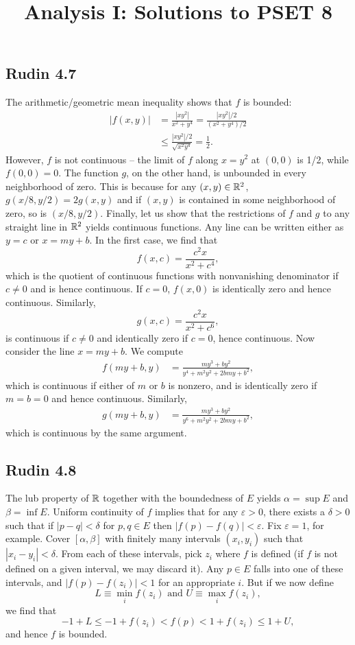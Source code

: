 \documentclass{../mathnotes}
\title{Analysis I: Solutions to PSET 8}
\author{}
\date{}
\begin{document}
\maketitle

\subsection*{Rudin 4.7}

The arithmetic/geometric mean inequality shows that $f$ is bounded:
\begin{align*}
    |f(x,y)| &= \frac{|xy^2|}{x^2+y^4} = \frac{|xy^2|/2}{(x^2+y^4)/2}\\
    &\leq \frac{|xy^2|/2}{\sqrt{x^2y^4}}=\frac{1}{2}.
\end{align*}
However, $f$ is not continuous -- the limit of $f$ along $x=y^2$ at $(0,0)$ is
1/2, while $f(0,0)=0$.
The function $g$, on the other hand, is unbounded in every neighborhood of zero.
This is because for any $(x,y)\in\mathbb{R}^2$, $g\left( x/8,y/2 \right)=2g\left( x,y \right)$
and if $(x,y)$ is contained in some neighborhood of zero, so is $(x/8,y/2)$.
Finally, let us show that the restrictions of $f$ and $g$ to any straight line
in $\mathbb{R}^2$ yields continuous functions. Any line can be written either as $y=c$ or
$x=my+b$. In the first case, we find that
\[f(x,c) = \frac{c^2x}{x^2+c^4},\]
which is the quotient of continuous functions with nonvanishing denominator if $c\neq 0$ and is
hence continuous. If $c=0$, $f(x,0)$ is identically zero and hence continuous.
Similarly,
\[g(x,c) = \frac{c^2x}{x^2+c^6},\]
is continuous if $c\neq0$ and identically zero if $c=0$, hence continuous.
Now consider the line $x=my+b$. We compute
\begin{align*}
    f(my+b,y) &= \frac{my^3+by^2}{y^4+m^2y^2+2bmy+b^2},
\end{align*}
which is continuous if either of $m$ or $b$ is nonzero, and is identically zero
if $m=b=0$ and hence continuous. Similarly,
\begin{align*}
    g(my+b,y) &= \frac{my^3+by^2}{y^6+m^2y^2+2bmy+b^2},
\end{align*}
which is continuous by the same argument.



\subsection*{Rudin 4.8}

The lub property of $\mathbb{R}$ together with the boundedness of $E$ yields
$\alpha=\sup E$ and $\beta=\inf E$. Uniform continuity of $f$ implies that for any
$\varepsilon>0$, there exists a $\delta>0$ such that if $|p-q|<\delta$ for
$p,q\in E$ then $|f(p)-f(q)|<\varepsilon$. Fix $\varepsilon=1$, for example.
Cover $[\alpha,\beta]$ with finitely many intervals $(x_i,y_i)$ such that
$|x_i-y_i|<\delta$. From each of these intervals, pick $z_i$ where $f$ is defined
(if $f$ is not defined on a given interval, we may discard it). Any $p\in E$ falls
into one of these intervals, and $|f(p)-f(z_i)|<1$ for an appropriate $i$.
But if we now define
\[L\equiv\min_i f(z_i)\text{ and } U\equiv\max_i f(z_i),\]
we find that
\[-1+L \leq -1+f(z_i)< f(p) < 1+f(z_i)\leq 1+U,\]
and hence $f$ is bounded.
\end{document}
